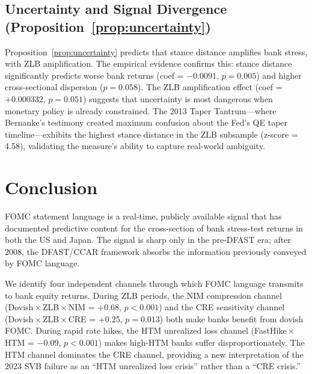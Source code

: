 \documentclass[12pt,a4paper]{article}
\begin{document}
\subsection{Uncertainty and Signal Divergence (Proposition~\ref{prop:uncertainty})}

Proposition~\ref{prop:uncertainty} predicts that stance distance amplifies bank stress, with ZLB amplification. The empirical evidence confirms this: stance distance significantly predicts worse bank returns (coef = $-0.0091$, $p = 0.005$) and higher cross-sectional dispersion ($p = 0.058$). The ZLB amplification effect (coef = $+0.000332$, $p = 0.051$) suggests that uncertainty is most dangerous when monetary policy is already constrained. The 2013 Taper Tantrum---where Bernanke's testimony created maximum confusion about the Fed's QE taper timeline---exhibits the highest stance distance in the ZLB subsample (z-score = 4.58), validating the measure's ability to capture real-world ambiguity.

\section{Conclusion}\label{sec:conclusion}

FOMC statement language is a real-time, publicly available signal that has documented predictive content for the cross-section of bank stress-test returns in both the US and Japan. The signal is sharp only in the pre-DFAST era; after 2008, the DFAST/CCAR framework absorbs the information previously conveyed by FOMC language.

We identify four independent channels through which FOMC language transmits to bank equity returns. During ZLB periods, the NIM compression channel (Dovish\,$\times$\,ZLB\,$\times$\,NIM = +0.68, $p < 0.001$) and the CRE sensitivity channel (Dovish\,$\times$\,ZLB\,$\times$\,CRE = +0.25, $p = 0.013$) both make banks benefit from dovish FOMC. During rapid rate hikes, the HTM unrealized loss channel (FastHike\,$\times$\,HTM = $-0.09$, $p < 0.001$) makes high-HTM banks suffer disproportionately. The HTM channel dominates the CRE channel, providing a new interpretation of the 2023 SVB failure as an ``HTM unrealized loss crisis'' rather than a ``CRE crisis.''
\end{document}
